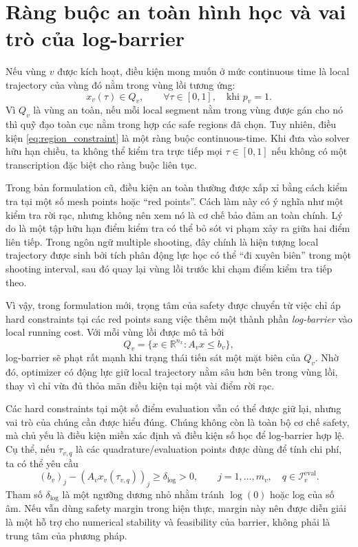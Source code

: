 \documentclass[12pt]{article}
\begin{document}
\section{Ràng buộc an toàn hình học và vai trò của log-barrier}

Nếu vùng $v$ được kích hoạt, điều kiện mong muốn ở mức continuous time là local trajectory của vùng đó nằm trong vùng lồi tương ứng:
\begin{equation}
x_v(\tau)\in Q_v,
\qquad \forall \tau\in[0,1],
\quad \text{khi }p_v=1.
\label{eq:region_constraint}
\end{equation}
Vì $Q_v$ là vùng an toàn, nếu mỗi local segment nằm trong vùng được gán cho nó thì quỹ đạo toàn cục nằm trong hợp các safe regions đã chọn. Tuy nhiên, điều kiện \eqref{eq:region_constraint} là một ràng buộc continuous-time. Khi đưa vào solver hữu hạn chiều, ta không thể kiểm tra trực tiếp mọi $\tau\in[0,1]$ nếu không có một transcription đặc biệt cho ràng buộc liên tục.

Trong bản formulation cũ, điều kiện an toàn thường được xấp xỉ bằng cách kiểm tra tại một số mesh points hoặc ``red points''. Cách làm này có ý nghĩa như một kiểm tra rời rạc, nhưng không nên xem nó là cơ chế bảo đảm an toàn chính. Lý do là một tập hữu hạn điểm kiểm tra có thể bỏ sót vi phạm xảy ra giữa hai điểm liên tiếp. Trong ngôn ngữ multiple shooting, đây chính là hiện tượng local trajectory được sinh bởi tích phân động lực học có thể ``đi xuyên biên'' trong một shooting interval, sau đó quay lại vùng lồi trước khi chạm điểm kiểm tra tiếp theo.

Vì vậy, trong formulation mới, trọng tâm của safety được chuyển từ việc chỉ áp hard constraints tại các red points sang việc thêm một thành phần \emph{log-barrier} vào local running cost. Với mỗi vùng lồi được mô tả bởi
\begin{equation}
Q_v=\{x\in\mathbb R^{n_x}: A_vx\le b_v\},
\label{eq:polytope_region}
\end{equation}
log-barrier sẽ phạt rất mạnh khi trạng thái tiến sát một mặt biên của $Q_v$. Nhờ đó, optimizer có động lực giữ local trajectory nằm sâu hơn bên trong vùng lồi, thay vì chỉ vừa đủ thỏa mãn điều kiện tại một vài điểm rời rạc.

Các hard constraints tại một số điểm evaluation vẫn có thể được giữ lại, nhưng vai trò của chúng cần được hiểu đúng. Chúng không còn là toàn bộ cơ chế safety, mà chủ yếu là điều kiện miền xác định và điều kiện số học để log-barrier hợp lệ. Cụ thể, nếu $\tau_{v,q}$ là các quadrature/evaluation points được dùng để tính chi phí, ta có thể yêu cầu
\begin{equation}
(b_v)_j-(A_vx_v(\tau_{v,q}))_j\ge \delta_{\log}>0,
\qquad j=1,\dots,m_v,
\quad q\in\mathcal I_v^{\mathrm{eval}}.
\label{eq:barrier_domain_constraint}
\end{equation}
Tham số $\delta_{\log}$ là một ngưỡng dương nhỏ nhằm tránh $\log(0)$ hoặc log của số âm. Nếu vẫn dùng safety margin trong hiện thực, margin này nên được diễn giải là một hỗ trợ cho numerical stability và feasibility của barrier, không phải là trung tâm của phương pháp.
\end{document}
